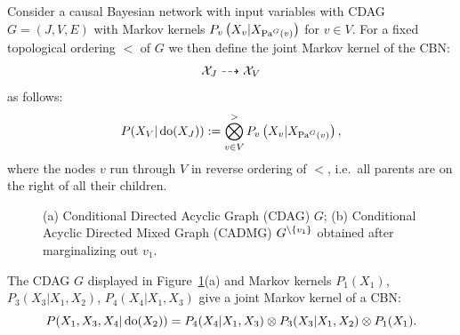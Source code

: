 \begin{Def}
    Consider a causal Bayesian network with input variables with CDAG $G=(J,V,E)$ with Markov kernels
    $P_v\left ( X_v| X_{\mathrm{Pa}^G(v)}\right )$ for $v \in V$.
    For a fixed topological ordering $<$ of $G$ 
    we  then define the joint Markov kernel of the CBN:
    \[ \mathcal{X}_J \dashrightarrow \mathcal{X}_V\]
    as follows:
    \[  P(X_V|\operatorname{do}(X_J)) := \bigotimes_{v \in V}^> P_v\left ( X_v|X_{\mathrm{Pa}^G(v)}\right ),  \]
    where the nodes $v$ run through $V$ in reverse ordering of $<$, i.e.\ 
    all parents are on the right of all their children.
\end{Def}

\begin{figure}[ht]
\centering
{}
\caption{(a) Conditional Directed Acyclic Graph (CDAG) $G$; (b) Conditional Acyclic Directed Mixed Graph (CADMG) $G^{\setminus \{v_1\}}$ obtained after marginalizing out $v_1$.}
\label{fig:cadg}
\end{figure}

\begin{Eg}\label{eg:cadg}
  The CDAG $G$ displayed in Figure~\ref{fig:cadg}(a) and Markov kernels
  $P_1(X_1)$, $P_3(X_3|X_1,X_2)$, $P_4(X_4|X_1,X_3)$ give a joint Markov kernel of a CBN:
  \[  P(X_1,X_3,X_4|\operatorname{do}(X_2)) = P_4(X_4|X_1,X_3) \otimes P_3(X_3|X_1,X_2) \otimes P_1(X_1). \]
\end{Eg}


